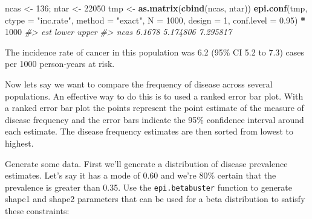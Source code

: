 \documentclass[
]{article}
\newenvironment{Shaded}{\begin{snugshade}}{\end{snugshade}}
\newcommand{\CommentTok}[1]{\textcolor[rgb]{0.56,0.35,0.01}{\textit{#1}}}
\newcommand{\DataTypeTok}[1]{\textcolor[rgb]{0.13,0.29,0.53}{#1}}
\newcommand{\DecValTok}[1]{\textcolor[rgb]{0.00,0.00,0.81}{#1}}
\newcommand{\FloatTok}[1]{\textcolor[rgb]{0.00,0.00,0.81}{#1}}
\newcommand{\KeywordTok}[1]{\textcolor[rgb]{0.13,0.29,0.53}{\textbf{#1}}}
\newcommand{\NormalTok}[1]{#1}
\newcommand{\OperatorTok}[1]{\textcolor[rgb]{0.81,0.36,0.00}{\textbf{#1}}}
\newcommand{\OtherTok}[1]{\textcolor[rgb]{0.56,0.35,0.01}{#1}}
\newcommand{\StringTok}[1]{\textcolor[rgb]{0.31,0.60,0.02}{#1}}
\begin{document}
\begin{Shaded}
\begin{Highlighting}[]
\NormalTok{ncas \textless{}{-}}\StringTok{ }\DecValTok{136}\NormalTok{; ntar \textless{}{-}}\StringTok{ }\DecValTok{22050}
\NormalTok{tmp \textless{}{-}}\StringTok{ }\KeywordTok{as.matrix}\NormalTok{(}\KeywordTok{cbind}\NormalTok{(ncas, ntar))}
\KeywordTok{epi.conf}\NormalTok{(tmp, }\DataTypeTok{ctype =} \StringTok{"inc.rate"}\NormalTok{, }\DataTypeTok{method =} \StringTok{"exact"}\NormalTok{, }\DataTypeTok{N =} \DecValTok{1000}\NormalTok{, }\DataTypeTok{design =} \DecValTok{1}\NormalTok{, }
   \DataTypeTok{conf.level =} \FloatTok{0.95}\NormalTok{) }\OperatorTok{*}\StringTok{ }\DecValTok{1000}
\CommentTok{\#\textgreater{}         est    lower    upper}
\CommentTok{\#\textgreater{} ncas 6.1678 5.174806 7.295817}
\end{Highlighting}
\end{Shaded}

The incidence rate of cancer in this population was 6.2 (95\% CI 5.2 to
7.3) cases per 1000 person-years at risk.

Now lets say we want to compare the frequency of disease across several
populations. An effective way to do this is to used a ranked error bar
plot. With a ranked error bar plot the points represent the point
estimate of the measure of disease frequency and the error bars indicate
the 95\% confidence interval around each estimate. The disease frequency
estimates are then sorted from lowest to highest.

Generate some data. First we'll generate a distribution of disease
prevalence estimates. Let's say it has a mode of 0.60 and we're 80\%
certain that the prevalence is greater than 0.35. Use the
\texttt{epi.betabuster} function to generate shape1 and shape2
parameters that can be used for a beta distribution to satisfy these
constraints:

\begin{Shaded}
\end{Shaded}
\end{document}
